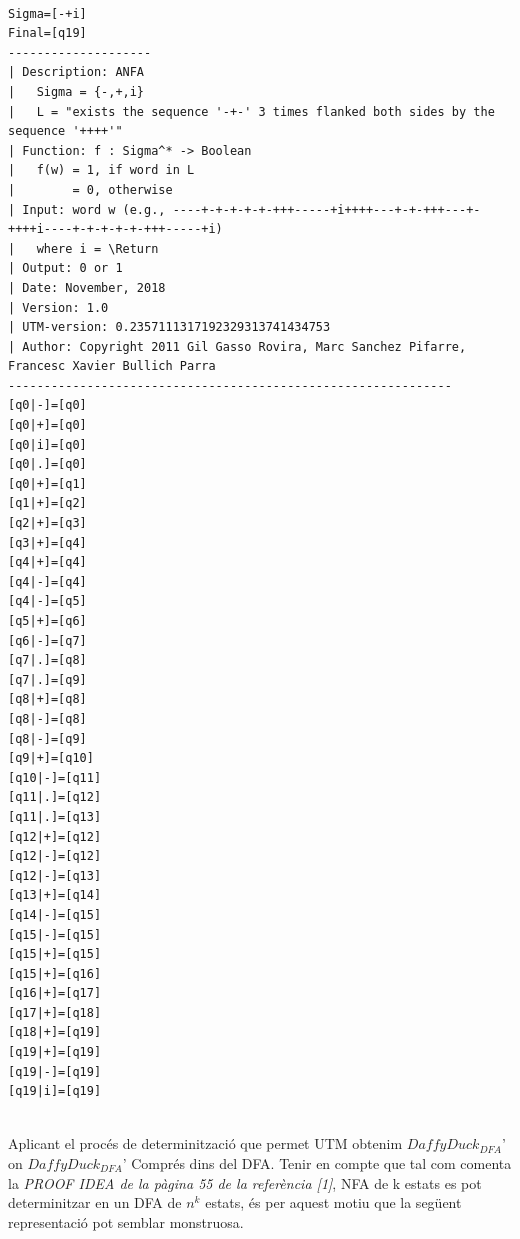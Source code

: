 \documentclass[12pt,a4paper]{report}
\def \dfa{$DaffyDuck_{DFA} $}
\begin{document}
\begin{lstlisting}

Sigma=[-+i]
Final=[q19]
--------------------
| Description: ANFA
|   Sigma = {-,+,i}
|   L = "exists the sequence '-+-' 3 times flanked both sides by the sequence '++++'"
| Function: f : Sigma^* -> Boolean
|   f(w) = 1, if word in L
|        = 0, otherwise
| Input: word w (e.g., ----+-+-+-+-+-+++-----+i++++---+-+-+++---+-++++i----+-+-+-+-+-+++-----+i)
|   where i = \Return
| Output: 0 or 1
| Date: November, 2018
| Version: 1.0
| UTM-version: 0.2357111317192329313741434753
| Author: Copyright 2011 Gil Gasso Rovira, Marc Sanchez Pifarre, Francesc Xavier Bullich Parra
--------------------------------------------------------------
[q0|-]=[q0]
[q0|+]=[q0]
[q0|i]=[q0]
[q0|.]=[q0]
[q0|+]=[q1]
[q1|+]=[q2]
[q2|+]=[q3]
[q3|+]=[q4]
[q4|+]=[q4]
[q4|-]=[q4]
[q4|-]=[q5]
[q5|+]=[q6]
[q6|-]=[q7]
[q7|.]=[q8]
[q7|.]=[q9]
[q8|+]=[q8]
[q8|-]=[q8]
[q8|-]=[q9]
[q9|+]=[q10]
[q10|-]=[q11]
[q11|.]=[q12]
[q11|.]=[q13]
[q12|+]=[q12]
[q12|-]=[q12]
[q12|-]=[q13]
[q13|+]=[q14]
[q14|-]=[q15]
[q15|-]=[q15]
[q15|+]=[q15]
[q15|+]=[q16]
[q16|+]=[q17]
[q17|+]=[q18]
[q18|+]=[q19]
[q19|+]=[q19]
[q19|-]=[q19]
[q19|i]=[q19]


\end{lstlisting}

Aplicant el procés de determinització que permet UTM obtenim \dfa{}' on \dfa{}' Comprés dins del DFA. Tenir en compte que tal com comenta la \textit{PROOF IDEA de la pàgina 55 de la referència [1]}, NFA de k estats es pot determinitzar en un DFA de $n^k$ estats, és per aquest motiu que la següent representació pot semblar monstruosa.
\end{document}
